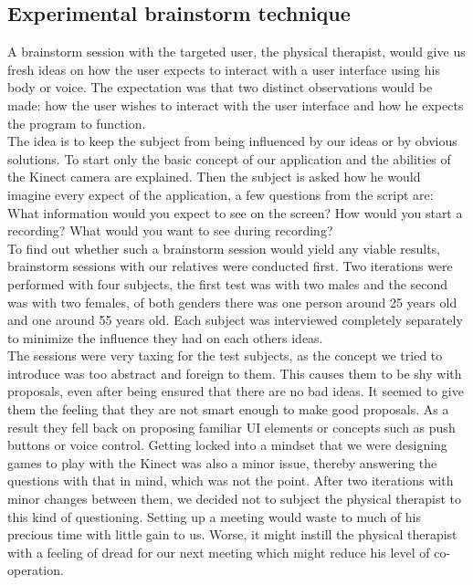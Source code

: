 \subsection{Experimental brainstorm technique}

A brainstorm session with the targeted user, the physical therapist, would give us fresh ideas on how the user expects to interact with a user interface using his body or voice. The expectation was that two distinct observations would be made: how the user wishes to interact with the user interface and how he expects the program to function.\\


The idea is to keep the subject from being influenced by our ideas or by obvious solutions. To start only the basic concept of our application and the abilities of the Kinect camera are explained. Then the subject is asked how he would imagine every expect of the application, a few questions from the script are: What information would you expect to see on the screen? How would you start a recording? What would you want to see during recording?\\

To find out whether such a brainstorm session would yield any viable results, brainstorm sessions with our relatives were conducted first. Two iterations were performed with four subjects, the first test was with two males and the second was with two females, of both genders there was one person around 25 years old and one around 55 years old. Each subject was interviewed completely separately to minimize the influence they had on each others ideas.\\

The sessions were very taxing for the test subjects, as the concept we tried to introduce was too abstract and foreign to them. This causes them to be shy with proposals, even after being ensured that there are no bad ideas. It seemed to give them the feeling that they are not smart enough to make good proposals. As a result they fell back on proposing  familiar UI elements or concepts such as push buttons or voice control. Getting locked into a mindset that we were designing games to play with the Kinect was also a minor issue, thereby answering the questions with that in mind, which was not the point. After two iterations with minor changes between them, we decided not to subject the physical therapist to this kind of questioning. Setting up a meeting would waste to much of his precious time with little gain to us. Worse, it might instill the physical therapist with a feeling of dread for our next meeting which might reduce his level of co-operation.\\

